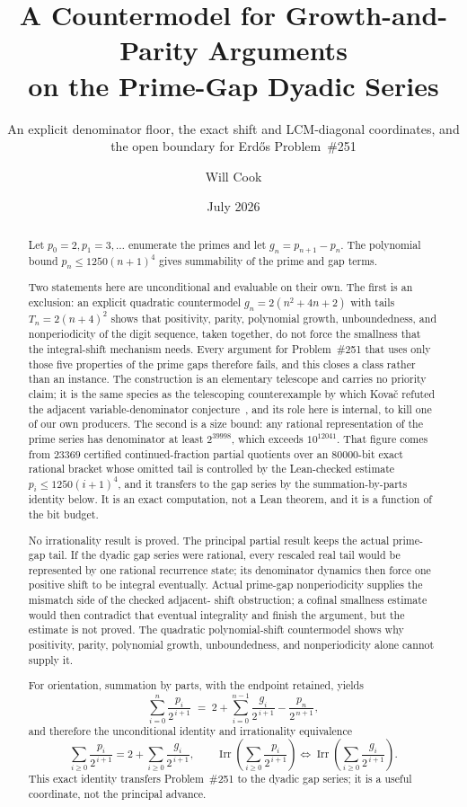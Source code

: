 \documentclass[11pt]{article}
\title{A Countermodel for Growth-and-Parity Arguments\\on the Prime-Gap Dyadic Series}
\subtitle{An explicit denominator floor, the exact shift and LCM-diagonal
coordinates, and the open boundary for Erd\H{o}s Problem~\#251}
\author{Will Cook}
\date{July 2026}
\begin{document}
\maketitle
\noteprovenance

\begin{abstract}
\noindent
Let $p_0=2,p_1=3,\ldots$ enumerate the primes and let
$g_n=p_{n+1}-p_n$.  The polynomial bound $p_n\le1250(n+1)^4$ gives summability
of the prime and gap terms.

Two statements here are unconditional and evaluable on their own.  The first
is an exclusion: an explicit quadratic countermodel $g_n=2(n^2+4n+2)$ with
tails $T_n=2(n+4)^2$ shows that positivity, parity, polynomial growth,
unboundedness, and nonperiodicity of the digit sequence, taken together, do
not force the smallness that the integral-shift mechanism needs.  Every
argument for Problem~\#251 that uses only those five properties of the prime
gaps therefore fails, and this closes a class rather than an instance.  The
construction is an elementary telescope and carries no priority claim; it is
the same species as the telescoping counterexample by which Kova\v{c}
refuted the adjacent variable-denominator conjecture~\cite{kovac2026}, and its
role here is internal, to kill one of our own producers.  The
second is a size bound: any rational representation of the prime series has
denominator at least $2^{39998}$, which exceeds $10^{12041}$.  That figure
comes from $23369$ certified continued-fraction partial quotients over an
$80000$-bit exact rational bracket whose omitted tail is controlled by the
Lean-checked estimate $p_i\le1250(i+1)^4$, and it transfers to the gap series
by the summation-by-parts identity below.  It is an exact computation, not a
Lean theorem, and it is a function of the bit budget.

No irrationality result is proved.  The principal partial result keeps the actual
prime-gap tail.  If the dyadic gap series were rational, every rescaled real
tail would be represented by one rational recurrence state; its denominator
dynamics then force one positive shift to be integral eventually.  Actual
prime-gap nonperiodicity supplies the mismatch side of the checked adjacent-
shift obstruction; a cofinal smallness estimate would then contradict that
eventual integrality and finish the argument, but the estimate is not proved.
The quadratic polynomial-shift countermodel
shows why positivity, parity, polynomial growth, unboundedness, and
nonperiodicity alone cannot supply it.

For orientation, summation by parts, with the endpoint retained,
yields
\[
 \sum_{i=0}^{n}\frac{p_i}{2^{\,i+1}}
 \;=\;2+\sum_{i=0}^{n-1}\frac{g_i}{2^{\,i+1}}-\frac{p_n}{2^{\,n+1}},
\]
and therefore the unconditional identity and irrationality equivalence
\[
 \sum_{i\ge0}\frac{p_i}{2^{\,i+1}}
 =2+\sum_{i\ge0}\frac{g_i}{2^{\,i+1}},\qquad
 \operatorname{Irr}\!\left(\sum_{i\ge0}\frac{p_i}{2^{\,i+1}}\right)
 \Longleftrightarrow
 \operatorname{Irr}\!\left(\sum_{i\ge0}\frac{g_i}{2^{\,i+1}}\right).
\]
This exact identity transfers Problem~\#251 to the dyadic gap series; it is a
useful coordinate, not the principal advance.


\end{abstract}
\end{document}

